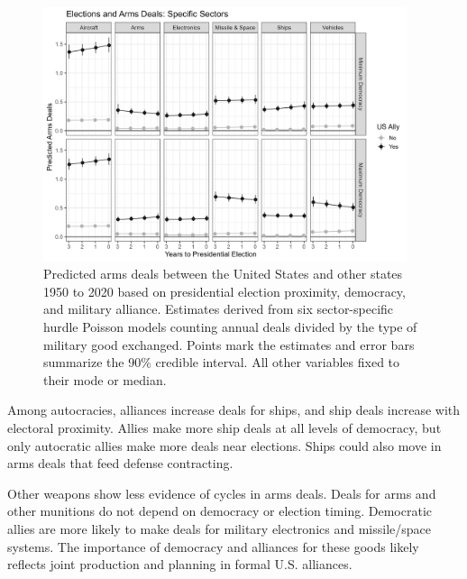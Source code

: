 \documentclass[12pt]{article}
\begin{document}
\begin{figure}[htpb]
	\centering
		\includegraphics[width=0.95\textwidth]{../figures/deals-sector.png}
	\caption{Predicted arms deals between the United States and other states 1950 to 2020 based on presidential election proximity, democracy, and military alliance. Estimates derived from six sector-specific hurdle Poisson models counting annual deals divided by the type of military good exchanged. Points mark the estimates and error bars summarize the 90\% credible interval. All other variables fixed to their mode or median.}
	\label{fig:deals-sector}
\end{figure}


Among autocracies, alliances increase deals for ships, and ship deals increase with electoral proximity. 
Allies make more ship deals at all levels of democracy, but only autocratic allies make more deals near elections. 
Ships could also move in arms deals that feed defense contracting. 


Other weapons show less evidence of cycles in arms deals. 
Deals for arms and other munitions do not depend on democracy or election timing. 
Democratic allies are more likely to make deals for military electronics and missile/space systems. 
The importance of democracy and alliances for these goods likely reflects joint production and planning in formal U.S. alliances. 


\end{document}
